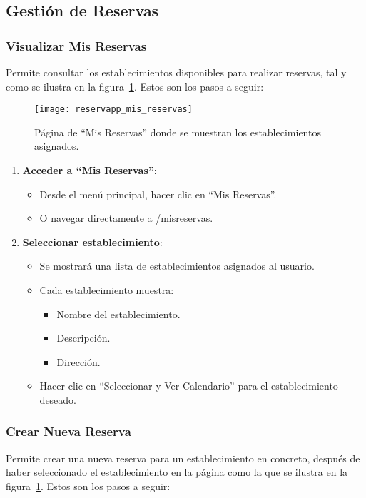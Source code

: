 \newpage

\subsection{Gestión de Reservas}

\subsubsection{Visualizar Mis Reservas}
Permite consultar los establecimientos disponibles para realizar reservas, tal y como se ilustra en la figura~\ref{fig:reservapp_mis_reservas}. Estos son los pasos a seguir:

\begin{figure}[H]
	\centering
		\texttt{[image: reservapp\_mis\_reservas]}
	\caption{Página de ``Mis Reservas'' donde se muestran los establecimientos asignados.}
	\label{fig:reservapp_mis_reservas}
\end{figure}

\begin{enumerate}
   \item \textbf{Acceder a ``Mis Reservas''}:
   \begin{itemize}
      \item Desde el menú principal, hacer clic en ``Mis Reservas''.
      \item O navegar directamente a /misreservas.
   \end{itemize}
   \item \textbf{Seleccionar establecimiento}:
   \begin{itemize}
      \item Se mostrará una lista de establecimientos asignados al usuario.
      \item Cada establecimiento muestra:
      \begin{itemize}
         \item Nombre del establecimiento.
         \item Descripción.
         \item Dirección.
      \end{itemize}
      \item Hacer clic en ``Seleccionar y Ver Calendario'' para el establecimiento deseado.
   \end{itemize}
\end{enumerate}

\newpage

\subsubsection{Crear Nueva Reserva}
Permite crear una nueva reserva para un establecimiento en concreto, después de haber seleccionado el establecimiento en la página como la que se ilustra en la figura~\ref{fig:reservapp_mis_reservas}. Estos son los pasos a seguir:

